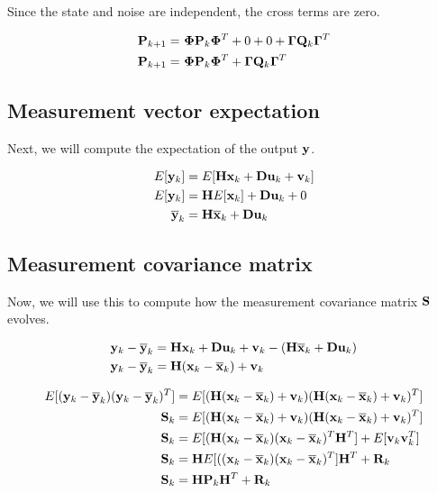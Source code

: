 Since the state and noise are independent, the cross terms are zero.

\begin{align*}
  \mathbf{P}_{k+1} =~& \mathbf{\Phi}\mathbf{P}_k\mathbf{\Phi}^T + 0 + 0 +
    \mathbf{\Gamma}\mathbf{Q}_k\mathbf{\Gamma}^T \\
  \mathbf{P}_{k+1} =~& \mathbf{\Phi}\mathbf{P}_k\mathbf{\Phi}^T +
    \mathbf{\Gamma}\mathbf{Q}_k\mathbf{\Gamma}^T
\end{align*}

\subsection{Measurement vector expectation}

Next, we will compute the expectation of the \gls{output} $\mathbf{y}$.

\begin{align*}
  E[\mathbf{y}_k] &= E[\mathbf{H}\mathbf{x}_k + \mathbf{D}\mathbf{u}_k + \mathbf{v}_k] \\
  E[\mathbf{y}_k] &= \mathbf{H}E[\mathbf{x}_k] + \mathbf{D}\mathbf{u}_k + 0 \\
  \overline{\mathbf{y}}_k &= \mathbf{H}\overline{\mathbf{x}}_k + \mathbf{D}\mathbf{u}_k
\end{align*}

\subsection{Measurement covariance matrix}

Now, we will use this to compute how the measurement covariance matrix
$\mathbf{S}$ evolves.

\begin{align*}
  \mathbf{y}_k - \overline{\mathbf{y}}_k &= \mathbf{H}\mathbf{x}_k + \mathbf{D}\mathbf{u}_k + \mathbf{v}_k -
    (\mathbf{H}\overline{\mathbf{x}}_k + \mathbf{D}\mathbf{u}_k) \\
  \mathbf{y}_k - \overline{\mathbf{y}}_k &= \mathbf{H}(\mathbf{x}_k - \overline{\mathbf{x}}_k) + \mathbf{v}_k
\end{align*}

\begin{align*}
  E[(\mathbf{y}_k - \overline{\mathbf{y}}_k)(\mathbf{y}_k - \overline{\mathbf{y}}_k)^T] &=
    E[(\mathbf{H}(\mathbf{x}_k - \overline{\mathbf{x}}_k) + \mathbf{v}_k)
      (\mathbf{H}(\mathbf{x}_k - \overline{\mathbf{x}}_k) + \mathbf{v}_k)^T] \\
  \mathbf{S}_k &= E[(\mathbf{H}(\mathbf{x}_k - \overline{\mathbf{x}}_k) + \mathbf{v}_k)
                 (\mathbf{H}(\mathbf{x}_k - \overline{\mathbf{x}}_k) + \mathbf{v}_k)^T] \\
  \mathbf{S}_k &= E[(\mathbf{H}(\mathbf{x}_k - \overline{\mathbf{x}}_k)
                 (\mathbf{x}_k - \overline{\mathbf{x}}_k)^T\mathbf{H}^T] +
               E[\mathbf{v}_k\mathbf{v}_k^T] \\
  \mathbf{S}_k &=
    \mathbf{H}E[((\mathbf{x}_k - \overline{\mathbf{x}}_k)(\mathbf{x}_k - \overline{\mathbf{x}}_k)^T]
    \mathbf{H}^T + \mathbf{R}_k \\
  \mathbf{S}_k &= \mathbf{H}\mathbf{P}_k\mathbf{H}^T + \mathbf{R}_k
\end{align*}
